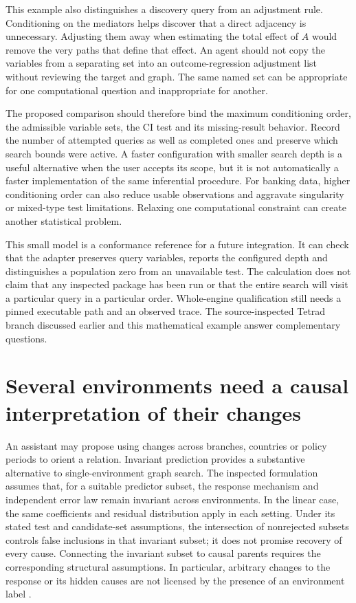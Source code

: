 This example also distinguishes a discovery query from an adjustment rule.
Conditioning on the mediators helps discover that a direct adjacency is
unnecessary. Adjusting them away when estimating the total effect of $A$
would remove the very paths that define that effect. An agent should not copy
the variables from a separating set into an outcome-regression adjustment
list without reviewing the target and graph. The same named set can be
appropriate for one computational question and inappropriate for another.

The proposed comparison should therefore bind the maximum conditioning order,
the admissible variable sets, the CI test and its missing-result behavior.
Record the number of attempted queries as well as completed ones and preserve
which search bounds were active. A faster configuration with smaller search
depth is a useful alternative when the user accepts its scope, but it is not
automatically a faster implementation of the same inferential procedure.
For banking data, higher conditioning order can also reduce usable observations
and aggravate singularity or mixed-type test limitations. Relaxing one
computational constraint can create another statistical problem.

This small model is a conformance reference for a future integration. It can
check that the adapter preserves query variables, reports the configured
depth and distinguishes a population zero from an unavailable test. The
calculation does not claim that any inspected package has been run or that
the entire search will visit a particular query in a particular order.
Whole-engine qualification still needs a pinned executable path and an
observed trace. The source-inspected Tetrad branch discussed earlier and this
mathematical example answer complementary questions.

\section{Several environments need a causal interpretation of their changes}
\label{exec14:l4-environments}

An assistant may propose using changes across branches, countries or policy
periods to orient a relation. Invariant prediction provides a substantive
alternative to single-environment graph search. The inspected formulation
assumes that, for a suitable predictor subset, the response mechanism and
independent error law remain invariant across environments. In the linear
case, the same coefficients and residual distribution apply in each setting.
Under its stated test and candidate-set assumptions, the intersection of
nonrejected subsets controls false inclusions in that invariant subset; it
does not promise recovery of every cause. Connecting the invariant subset to
causal parents requires the corresponding structural assumptions. In
particular, arbitrary changes to the response or its hidden causes are not
licensed by the presence of an environment label
\citep{petersicp2016}.

